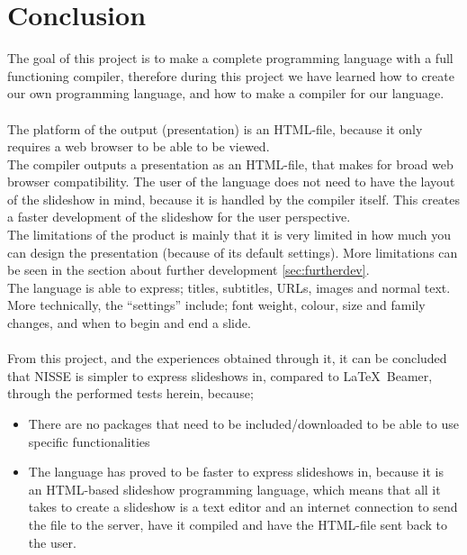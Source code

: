 \chapter{Conclusion}

The goal of this project is to make a complete programming language with a full functioning compiler, therefore during this project we have learned how to create our own programming language, and how to make a compiler for our language. \\

 \\
The platform of the output (presentation) is an HTML-file, because it only requires a web browser to be able to be viewed. \\
The compiler outputs a presentation as an HTML-file, that makes for broad web browser compatibility. The user of the language does not need to have the layout of the slideshow in mind, because it is handled by the compiler itself. This creates a faster development of the slideshow for the user perspective. \\
The limitations of the product is mainly that it is very limited in how much you can design the presentation (because of its default settings). More limitations can be seen in the section about further development \ref{sec:furtherdev}. \\
The language is able to express; titles, subtitles, URLs, images and normal text. \\
More technically, the ``settings'' include; font weight, colour, size and family changes, and when to begin and end a slide.
\\ \\
From this project, and the experiences obtained through it, it can be concluded that NISSE is simpler to express slideshows in, compared to \LaTeX~Beamer, through the performed tests herein, because;
\begin{itemize}
	\item There are no packages that need to be included/downloaded to be able to use specific functionalities
	\item The language has proved to be faster to express slideshows in, because it is an HTML-based slideshow programming language, which means that all it takes to create a slideshow is a text editor and an internet connection to send the file to the server, have it compiled and have the HTML-file sent back to the user.
\end{itemize}